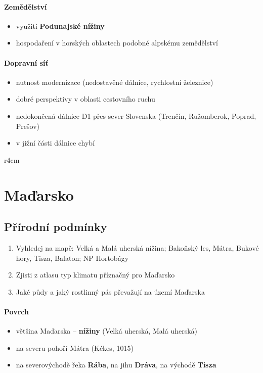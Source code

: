 \paragraph{Zemědělství}
\begin{itemize}
\item využití \textbf{Podunajské nížiny}
\item hospodaření v horských oblastech podobné alpskému zemědělství 
\end{itemize}

\paragraph{Dopravní síť}
\begin{itemize}
\item nutnost modernizace (nedostavěné dálnice, rychlostní železnice)
\item dobré perspektivy v oblasti cestovního ruchu
\item nedokončená dálnice D1 přes sever Slovenska (Trenčín, Ružomberok, Poprad, Prešov)
\item v jižní části dálnice chybí
\end{itemize}



\newpage
\mbox{}
\vspace{-1.5cm}
\begin{wrapfigure}{r}{4cm}
\vspace{-50pt}
\end{wrapfigure}	
\section{Maďarsko}
\subsection{Přírodní podmínky}
\begin{enumerate}
\item Vyhledej na mapě: Velká a Malá uherská nížina; Bakoňský les, Mátra, Bukové hory, Tisza, Balaton; NP Hortobágy
\item Zjisti z atlasu typ klimatu příznačný pro Maďarsko
\item Jaké půdy a jaký rostlinný pás převažují na území Maďarska
\end{enumerate}

\paragraph{Povrch}
\begin{itemize}
\item většina Maďarska -- \textbf{nížiny} (Velká uherská, Malá uherská)
\item na severu pohoří Mátra (Kékes, 1015)
\item na severovýchodě řeka \textbf{Rába}, na jihu \textbf{Dráva}, na východě\textbf{ Tisza}
\end{itemize}




